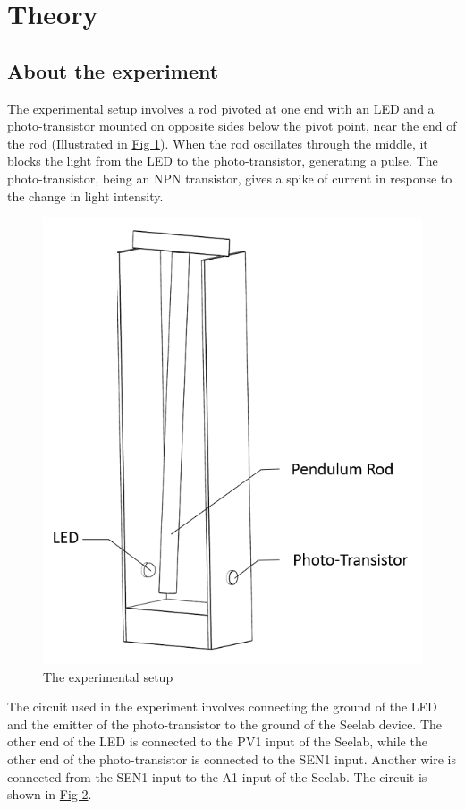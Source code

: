 \section{Theory}
	\subsection{About the experiment}

		The experimental setup involves a rod pivoted at one end with an LED and a photo-transistor mounted on opposite sides below the pivot point, near the end of the rod (Illustrated in \hyperref[th:1]{Fig 1}). When the rod oscillates through the middle, it blocks the light from the LED to the photo-transistor, generating a pulse. The photo-transistor, being an NPN transistor, gives a spike of current in response to the change in light intensity.

		\begin{figure}
			\centering
			\includegraphics[width=0.6\columnwidth]{images/setup1.png}
			\caption{The experimental setup}
			\label{th:1}
		\end{figure}

		The circuit used in the experiment involves connecting the ground of the LED and the emitter of the photo-transistor to the ground of the Seelab device. The other end of the LED is connected to the PV1 input of the Seelab, while the other end of the photo-transistor is connected to the SEN1 input. Another wire is connected from the SEN1 input to the A1 input of the Seelab. The circuit is shown in \hyperref[th:2]{Fig 2}.

